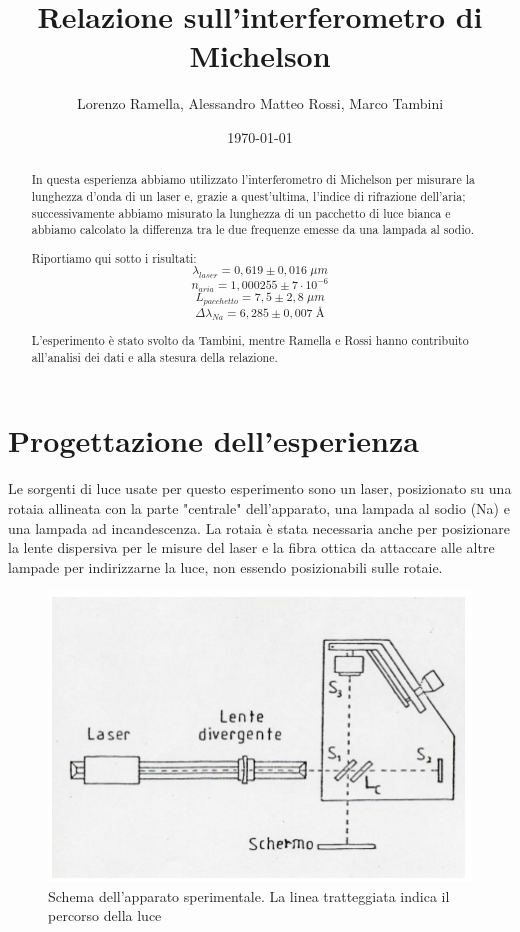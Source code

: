 \documentclass{article}
\title{Relazione sull'interferometro di Michelson}
\author{Lorenzo Ramella, Alessandro Matteo Rossi, Marco Tambini}
\date{\today}
\begin{document}
\maketitle

\begingroup
{}
\begin{abstract}
In questa esperienza abbiamo utilizzato l'interferometro di Michelson per misurare la lunghezza d'onda di un laser e, grazie a quest'ultima, l'indice di rifrazione dell'aria; successivamente abbiamo misurato la lunghezza di un pacchetto di luce bianca e abbiamo calcolato la differenza tra le due frequenze emesse da una lampada al sodio.

Riportiamo qui sotto i risultati:
\[ \lambda_{laser} = 0,619 \pm 0,016 \; \mu m \]
\[ n_{aria} = 1,000255 \pm 7 \cdot 10^{-6} \]
\[ L_{pacchetto} = 7,5 \pm 2,8 \; \mu m \]
\[ \Delta \lambda_{Na} = 6,285 \pm 0,007 \; \textrm{Å} \]

L'esperimento è stato svolto da Tambini, mentre Ramella e Rossi hanno contribuito all'analisi dei dati e alla stesura della relazione.
\end{abstract}
\endgroup

\tableofcontents



\section{Progettazione dell'esperienza}
Le sorgenti di luce usate per questo esperimento sono un laser, posizionato su una rotaia allineata con la parte "centrale" dell'apparato, una lampada al sodio (Na) e una lampada ad incandescenza. La rotaia è stata necessaria anche per posizionare la lente dispersiva per le misure del laser e la fibra ottica da attaccare alle altre lampade per indirizzarne la luce, non essendo posizionabili sulle rotaie.

\begin{figure}[h!]
  \centering
  \includegraphics[width=0.7\linewidth]{IM percorso luce}
  \caption{Schema dell'apparato sperimentale. La linea tratteggiata indica il percorso della luce}
\end{figure}
\end{document}
